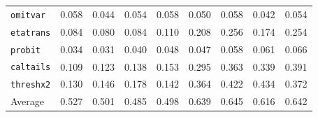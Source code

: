 \begin{tabular}{lcccccccc}
\texttt{omitvar} & 0.058 & 0.044 & 0.054 & 0.058 & 0.050 & 0.058 & 0.042 & 0.054 \\
\texttt{etatrans} & 0.084 & 0.080 & 0.084 & 0.110 & 0.208 & 0.256 & 0.174 & 0.254 \\
\texttt{probit} & 0.034 & 0.031 & 0.040 & 0.048 & 0.047 & 0.058 & 0.061 & 0.066 \\
\texttt{caltails} & 0.109 & 0.123 & 0.138 & 0.153 & 0.295 & 0.363 & 0.339 & 0.391 \\
\texttt{threshx2} & 0.130 & 0.146 & 0.178 & 0.142 & 0.364 & 0.422 & 0.434 & 0.372 \\
\midrule
Average & 0.527 & 0.501 & 0.485 & 0.498 & 0.639 & 0.645 & 0.616 & 0.642 \\
\bottomrule
\end{tabular}